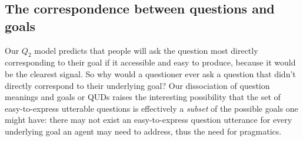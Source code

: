 \documentclass[11pt, floatsintext]{apa6}
\begin{document}



 
\subsection{The correspondence between questions and goals}

Our $Q_2$ model predicts that people will ask the question most directly corresponding to their goal if it accessible and easy to produce, because it would be the clearest signal.
So why would a questioner ever ask a question that didn't directly correspond to their underlying goal? 
Our dissociation of question meanings and goals or QUDs raises the interesting possibility that the set of easy-to-express utterable questions is effectively a \emph{subset} of the possible goals one might have: there may not exist an easy-to-express question utterance for every underlying goal an agent may need to address, thus the need for pragmatics.
\end{document}
